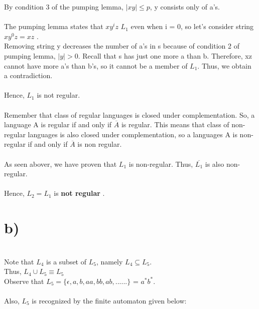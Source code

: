 \documentclass[11pt]{article}
\begin{document}
By condition 3 of the pumping lemma, $|xy| \leq p$, y consists only of a's. \\ \\

The pumping lemma states that $ xy^{i}z $ \in $ L_{1}$ even when i = 0, so let's consider string $xy^{0}z = xz$ . \\ Removing string y decreases the number of a's in s because of condition 2 of pumping lemma, $|y| > 0$. Recall that s has just one more a than b. Therefore,
xz cannot have more a's than b's, so it cannot be a member of $L_1$. Thus, we obtain a contradiction.  \\ \\

\noindent
Hence, $L_1$ is not regular. \\ \\

\noindent Remember that class of regular languages is closed under complementation. So, a language A is
regular if and only if $\overline{A}$ is regular.  This means that class of non-regular languages is also closed under complementation, so a languages A is non-regular if and only if
$\overline{A}$ is non regular. \\ \\

\noindent As seen abover, we have proven that $L_1$ is non-regular. Thus, $\overline{L_1}$ is also non-regular. \\ \\

\noindent Hence, $L_2 = L_1$ is \textbf{not regular} . 









\newpage
\section*{b)} \\
Note that $L_4$ is a subset of $L_5$, namely $L_4 \subseteq L_5$. \\

\noindent Thus, $L_4 \cup L_5 \equiv L_5$  \\

\noindent Observe that $L_5 = \{\epsilon, a, b, aa, bb, ab, ......\}$ = $a^*b^*$. \\ \\

\noindent Also, $L_5$ is recognized by the finite automaton given below:  \\ \\
\end{document}
